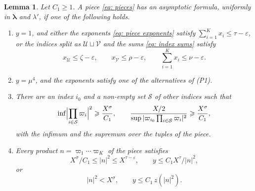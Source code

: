 \documentclass{article}
\numberwithin{equation}{section}
\newtheorem{lemma}{Lemma}
\newcommand{\Le}{\leqslant}
\newcommand{\Ge}{\geqslant}
\begin{document}
\begin{lemma}
\label{lem: pieces}
Let $C_1 \Ge 1$. A piece \eqref{eq: pieces} has an asymptotic formula, uniformly in $\boldsymbol{\lambda}$ and $\lambda'$, if one of the following holds.
\begin{enumerate}[(P1)]
\item $y = 1$, and either the exponents \eqref{eq: piece exponents} satisfy $\sum_{i=1}^{K} x_i \Le \tau - \varepsilon$, or the indices split as $\mathcal{U} \sqcup \mathcal{V}$ and the sums \eqref{eq: index sums} satisfy
\begin{equation*}
x_{\mathcal{U}} \Le \zeta - \varepsilon, \qquad x_{\mathcal{V}} \Le \rho - \varepsilon, \qquad \sum_{i=1}^{K} x_i \Le \nu - \varepsilon.
\end{equation*}
\item $y = \mu^4$, and the exponents satisfy one of the alternatives of (P1).
\item There are an index $i_0$ and a non-empty set $\mathcal{S}$ of other indices such that
\begin{equation*}
\inf \Bigl| \prod_{i \in \mathcal{S}} \varpi_i \Bigr|^2 \Ge \frac{X^{\sigma}}{C_1}, \qquad \frac{X/2}{\sup |\varpi_{i_0} \prod_{i \in \mathcal{S}} \varpi_i|^2} \Ge \frac{X^{\sigma}}{C_1},
\end{equation*}
with the infimum and the supremum over the tuples of the piece.
\item Every product $n = \varpi_1 \cdots \varpi_K$ of the piece satisfies
\begin{equation}
\label{eq: P4 large}
X^{\sigma}/C_1 \Le |n|^2 \Le X^{\tau - \varepsilon}, \qquad y \Le C_1 X^{\tau}/|n|^2,
\end{equation}
or
\begin{equation}
\label{eq: P4 small}
|n|^2 < X^{\sigma}, \qquad y \Le C_1\, z(|n|^2).
\end{equation}
\end{enumerate}
\end{lemma}
\end{document}

